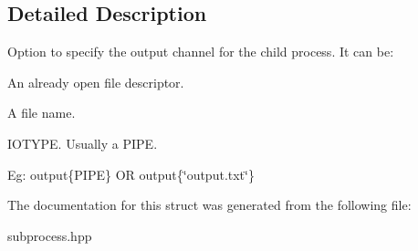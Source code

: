 \subsection{Detailed Description}
Option to specify the output channel for the child process. It can be\+:
\begin{DoxyEnumerate}
\item An already open file descriptor.
\item A file name.
\item I\+O\+T\+Y\+PE. Usually a P\+I\+PE.
\end{DoxyEnumerate}

Eg\+: output\{P\+I\+PE\} OR output\{\char`\"{}output.\+txt\char`\"{}\} 

The documentation for this struct was generated from the following file\+:\begin{DoxyCompactItemize}
\item 
subprocess.\+hpp\end{DoxyCompactItemize}

